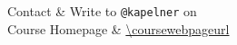 Contact 										& Write to \texttt{@kapelner} on \slacklink  \\
Course Homepage 							& \url{\coursewebpageurl} \\
